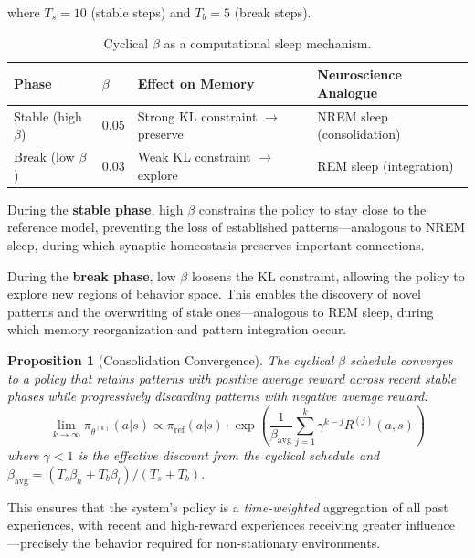 \documentclass[11pt, a4paper]{article}
\newtheorem{proposition}{Proposition}
\begin{document}
where $T_s = 10$ (stable steps) and $T_b = 5$ (break steps).

\begin{table}[H]
\centering
\begin{tabular}{llll}
\toprule
\textbf{Phase} & $\beta$ & \textbf{Effect on Memory} & \textbf{Neuroscience Analogue} \\
\midrule
Stable (high $\beta$) & 0.05 & Strong KL constraint $\to$ preserve & NREM sleep (consolidation) \\
Break (low $\beta$) & 0.03 & Weak KL constraint $\to$ explore & REM sleep (integration) \\
\bottomrule
\end{tabular}
\caption{Cyclical $\beta$ as a computational sleep mechanism.}
\end{table}

During the \textbf{stable phase}, high $\beta$ constrains the policy to stay close to the reference model, preventing the loss of established patterns---analogous to NREM sleep, during which synaptic homeostasis preserves important connections.

During the \textbf{break phase}, low $\beta$ loosens the KL constraint, allowing the policy to explore new regions of behavior space. This enables the discovery of novel patterns and the overwriting of stale ones---analogous to REM sleep, during which memory reorganization and pattern integration occur.

\begin{proposition}[Consolidation Convergence]
The cyclical $\beta$ schedule converges to a policy that retains patterns with positive average reward across recent stable phases while progressively discarding patterns with negative average reward:
\begin{equation}
  \lim_{k \to \infty} \pi_{\theta^{(k)}}(a | s) \propto \pi_{\text{ref}}(a | s) \cdot \exp\left(\frac{1}{\beta_{\text{avg}}} \sum_{j=1}^{k} \gamma^{k-j} R^{(j)}(a, s)\right)
\end{equation}
where $\gamma < 1$ is the effective discount from the cyclical schedule and $\beta_{\text{avg}} = (T_s \beta_h + T_b \beta_l)/(T_s + T_b)$.
\end{proposition}

This ensures that the system's policy is a \emph{time-weighted} aggregation of all past experiences, with recent and high-reward experiences receiving greater influence---precisely the behavior required for non-stationary environments.


\end{document}
